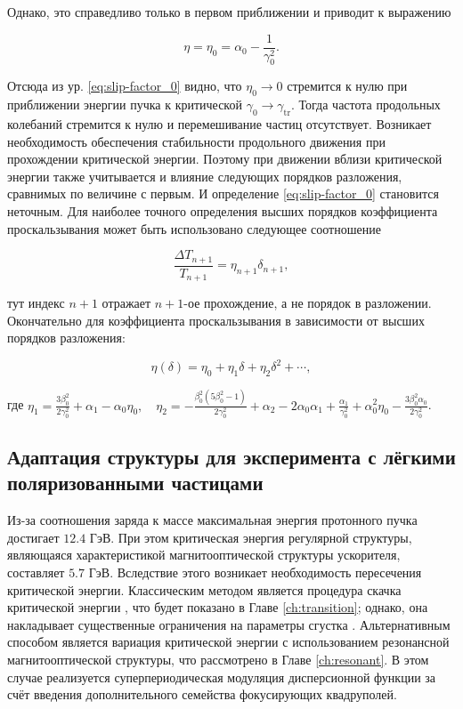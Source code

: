 \noindent Однако, это справедливо только в первом приближении и приводит к выражению

\begin{equation}
	\eta = \eta_{0} = \alpha_{0} - \frac{1}{\gamma_{0}^2}.
	\label{eq:slip-factor_0}
\end{equation}

\noindent Отсюда из ур. \ref{eq:slip-factor_0} видно, что $\eta_{0}\rightarrow 0$ стремится к нулю при приближении энергии пучка к критической $\gamma_{0}\rightarrow\gamma_{\textrm{tr}}$. Тогда частота продольных колебаний стремится к нулю и перемешивание частиц отсутствует. Возникает необходимость обеспечения стабильности продольного движения при прохождении критической энергии. Поэтому при движении вблизи критической энергии также учитывается и влияние следующих порядков разложения, сравнимых по величине с первым. И определение \ref{eq:slip-factor_0} становится неточным. Для наиболее точного определения высших порядков коэффициента проскальзывания может быть использовано следующее соотношение \cite{ng}

\begin{equation}
	\frac{\Delta T_{n+1}}{T_{n+1}}=\eta_{n+1} \delta_{n+1},
\end{equation}

\noindent тут индекс $n+1$ отражает $n+1$-ое прохождение, а не порядок в разложении. Окончательно для коэффициента проскальзывания в зависимости от высших порядков разложения:

\begin{equation}
	\eta(\delta)=\eta_0+\eta_1 \delta+\eta_2 \delta^2+\cdots,
	\label{eq:eta}
\end{equation}

\noindent где $\eta_1=\frac{3\beta_0^2}{2\gamma_0^2}+\alpha_1-\alpha_0\eta_0,\quad\eta_2=-\frac{\beta_0^2\left(5 \beta_0^2-1\right)}{2 \gamma_0^2}+\alpha_2-2 \alpha_0 \alpha_1+\frac{\alpha_1}{\gamma_0^2}+\alpha_0^2 \eta_0-\frac{3 \beta_0^2 \alpha_0}{2 \gamma_0^2}$.

\subsection{Адаптация структуры для эксперимента с лёгкими поляризованными частицами}\label{sec:ch:ions_light/transition/energy}

\par Из-за соотношения заряда к массе максимальная энергия протонного пучка достигает $12.4$ ГэВ. При этом критическая энергия регулярной структуры, являющаяся характеристикой магнитооптической структуры ускорителя, составляет $5.7$ ГэВ. Вследствие этого возникает необходимость пересечения критической энергии. Классическим методом является процедура скачка критической энергии \cite{Kolokolchikov:2024_bb_rupac}, что будет показано в Главе \ref{ch:transition}; однако, она накладывает существенные ограничения на параметры сгустка \cite{Kolokolchikov:2024_bb_dspin}. Альтернативным способом является вариация критической энергии с использованием резонансной магнитооптической структуры, что рассмотрено в Главе \ref{ch:resonant}. В этом случае реализуется суперпериодическая модуляция дисперсионной функции за счёт введения дополнительного семейства фокусирующих квадруполей.

